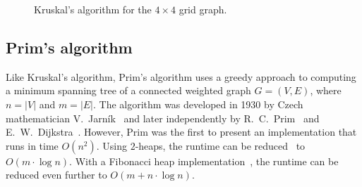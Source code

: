 \begin{figure}[!htbp]
\centering

\caption{Kruskal's algorithm for the $4\times 4$ grid graph.}
\label{fig:trees-forests:Kruskal_example}
\end{figure}



\subsection{Prim's algorithm}
\label{subsec:trees_forests:Prim_algorithm}

Like Kruskal's algorithm, Prim's algorithm uses a greedy approach to
computing a minimum spanning tree of a connected weighted graph
$G = (V,E)$, where $n = |V|$ and $m = |E|$. The algorithm was
developed in 1930 by Czech mathematician V.~Jarn\'ik~\cite{Jarnik1930}
and later independently by R.~C.~Prim~\cite{Prim1957} and
E.~W.~Dijkstra~\cite{Dijkstra1959}. However, Prim was the first to
present an implementation that runs in time $O(n^2)$. Using $2$-heaps,
the runtime can be reduced~\cite{KershenbaumVanSlyke1972} to
$O(m \cdot \log n)$. With a Fibonacci heap
implementation~\cite{FredmanTarjan1984,FredmanTarjan1987}, the runtime
can be reduced even further to $O(m + n \cdot \log n)$.

